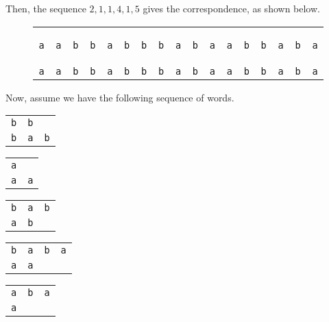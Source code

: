 \documentclass[a4paper, openany]{memoir}
\begin{document}
\noindent Then, the sequence $2, 1, 1, 4, 1, 5$ gives the correspondence, as shown below.
\begin{figure}[H]
    \centering
    \begin{tabular}{ccccccccccccccccc}
        \texttt{\color{blue} a} & \texttt{\color{red} a} & \texttt{\color{red} b} & \texttt{\color{red} b} & \texttt{\color{blue} a} & \texttt{\color{blue} b} & \texttt{\color{blue} b} & \texttt{\color{red} b} & \texttt{\color{red} a} & \texttt{\color{red} b} & \texttt{\color{red} a} & \texttt{\color{blue} a} & \texttt{\color{blue} b} & \texttt{\color{blue} b} & \texttt{\color{red} a} & \texttt{\color{red} b} & \texttt{\color{red} a}\\
        \texttt{\color{blue} a} & \texttt{\color{blue} a} & \texttt{\color{red} b} &  \texttt{\color{red} b} & \texttt{\color{red} a} & \texttt{\color{red} b} & \texttt{\color{blue} b} & \texttt{\color{blue} b} & \texttt{\color{blue} a} & \texttt{\color{blue} b} & \texttt{\color{red} a} & \texttt{\color{red} a} & \texttt{\color{blue} b} & \texttt{\color{blue} b} & \texttt{\color{blue} a} & \texttt{\color{blue} b} & \texttt{\color{red} a}
    \end{tabular}
\end{figure}
Now, assume we have the following sequence of words.
\begin{table}[H]
    \centering
    \begin{tabular}{ccc}
        \texttt{b} & \texttt{b} & \\
        \texttt{b} & \texttt{a} & \texttt{b}
    \end{tabular}
    \hspace{5pt}
    \begin{tabular}{cc}
        \texttt{a} & \\
        \texttt{a} & \texttt{a} 
    \end{tabular}
    \hspace{5pt}
    \begin{tabular}{ccc}
        \texttt{b} & \texttt{a} & \texttt{b} \\
        \texttt{a} & \texttt{b} 
    \end{tabular}
    \hspace{5pt}
    \begin{tabular}{cccc}
        \texttt{b} & \texttt{a} & \texttt{b} & \texttt{a} \\
        \texttt{a} & \texttt{a} 
    \end{tabular}
    \hspace{5pt}
    \begin{tabular}{ccc}
        \texttt{a} & \texttt{b} & \texttt{a} \\
        \texttt{a}
    \end{tabular}
\end{table}
\end{document}
